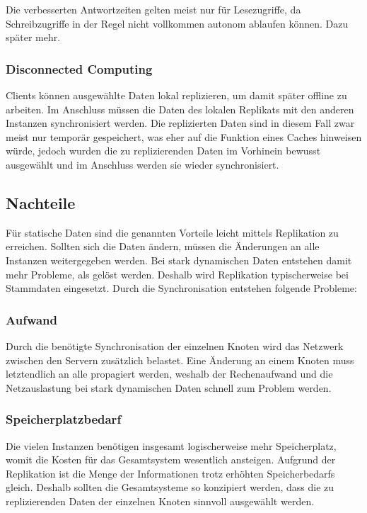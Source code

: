 Die verbesserten Antwortzeiten gelten meist nur für Lesezugriffe, da Schreibzugriffe in der Regel nicht vollkommen autonom ablaufen können. Dazu später mehr.

\subsubsection{Disconnected Computing}

Clients können ausgewählte Daten lokal replizieren, um damit später offline zu arbeiten. Im Anschluss müssen die Daten des lokalen Replikats mit den anderen Instanzen synchronisiert werden. \cite{leipzig} Die replizierten Daten sind in diesem Fall zwar meist nur temporär gespeichert, was eher auf die Funktion eines Caches hinweisen würde, jedoch wurden die zu replizierenden Daten im Vorhinein bewusst ausgewählt und im Anschluss werden sie wieder synchronisiert.

\subsection{Nachteile}

Für statische Daten sind die genannten Vorteile leicht mittels Replikation zu erreichen. Sollten sich die Daten ändern, müssen die Änderungen an alle Instanzen weitergegeben werden. Bei stark dynamischen Daten entstehen damit mehr Probleme, als gelöst werden. Deshalb wird Replikation typischerweise bei Stammdaten eingesetzt. \cite{kaiserslautern}
\clearpage
Durch die Synchronisation entstehen folgende Probleme:

\subsubsection{Aufwand}

Durch die benötigte Synchronisation der einzelnen Knoten wird das Netzwerk zwischen den Servern zusätzlich belastet. Eine Änderung an einem Knoten muss letztendlich an alle propagiert werden, weshalb der Rechenaufwand und die Netzauslastung bei stark dynamischen Daten schnell zum Problem werden.

\subsubsection{Speicherplatzbedarf}

Die vielen Instanzen benötigen insgesamt logischerweise mehr Speicherplatz, womit die Kosten für das Gesamtsystem wesentlich ansteigen. Aufgrund der Replikation ist die Menge der Informationen trotz erhöhten Speicherbedarfs gleich. Deshalb sollten die Gesamtsysteme so konzipiert werden, dass die zu replizierenden Daten der einzelnen Knoten sinnvoll ausgewählt werden.

